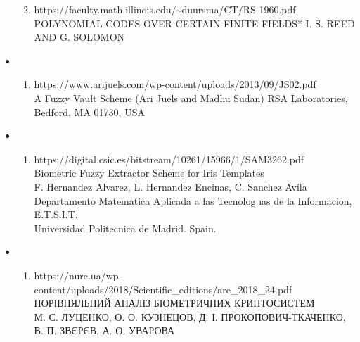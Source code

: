 \documentclass[11pt]{article}
\providecommand{\tightlist}{%
      \setlength{\itemsep}{0pt}\setlength{\parskip}{0pt}}
\begin{document}
\begin{itemize}
\begin{enumerate}
  \def\labelenumi{(\arabic{enumi})}
  \setcounter{enumi}{3}
  \tightlist
  \item
    https://faculty.math.illinois.edu/\textasciitilde duursma/CT/RS-1960.pdf\\
    POLYNOMIAL CODES OVER CERTAIN FINITE FIELDS* I. S. REED AND G.
    SOLOMON
  \end{enumerate}
\item
  \begin{enumerate}
  \def\labelenumi{(\arabic{enumi})}
  \setcounter{enumi}{4}
  \tightlist
  \item
    https://www.arijuels.com/wp-content/uploads/2013/09/JS02.pdf\\
    A Fuzzy Vault Scheme (Ari Juels and Madhu Sudan) RSA Laboratories,
    Bedford, MA 01730, USA
  \end{enumerate}
\item
  \begin{enumerate}
  \def\labelenumi{(\arabic{enumi})}
  \setcounter{enumi}{5}
  \tightlist
  \item
    https://digital.csic.es/bitstream/10261/15966/1/SAM3262.pdf\\
    Biometric Fuzzy Extractor Scheme for Iris Templates\\
    F. Hernandez Alvarez, L. Hernandez Encinas, C. Sanchez Avila\\
    Departamento Matematica Aplicada a las Tecnolog ıas de la
    Informacion, E.T.S.I.T.\\
    Universidad Politecnica de Madrid. Spain.
  \end{enumerate}
\item
  \begin{enumerate}
  \def\labelenumi{(\arabic{enumi})}
  \setcounter{enumi}{6}
  \tightlist
  \item
    https://nure.ua/wp-content/uploads/2018/Scientific\_editions/are\_2018\_24.pdf\\
    ПОРІВНЯЛЬНИЙ АНАЛІЗ БІОМЕТРИЧНИХ КРИПТОСИСТЕМ\\
    М. С. ЛУЦЕНКО, О. О. КУЗНЕЦОВ, Д. І. ПРОКОПОВИЧ-ТКАЧЕНКО, В. П.
    ЗВЄРЄВ, А. О. УВАРОВА
  \end{enumerate}
\end{itemize}


    
    
    
\end{document}
